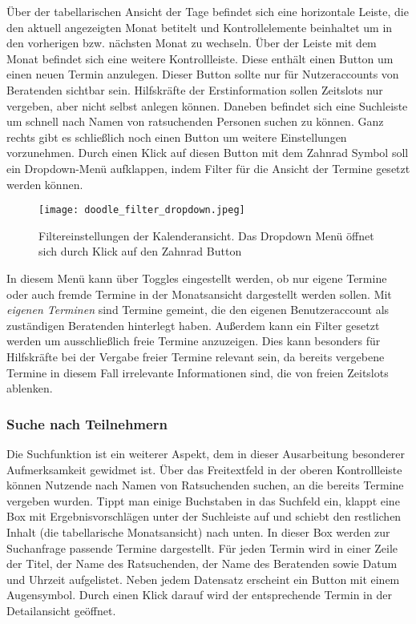 Über der tabellarischen Ansicht der Tage befindet sich eine horizontale Leiste, die den aktuell angezeigten Monat betitelt und Kontrollelemente beinhaltet um in den vorherigen bzw. nächsten Monat zu wechseln. Über der Leiste mit dem Monat befindet sich eine weitere Kontrollleiste. Diese enthält einen Button um einen neuen Termin anzulegen. Dieser Button sollte nur für Nutzeraccounts von Beratenden sichtbar sein. Hilfskräfte der Erstinformation sollen Zeitslots nur vergeben, aber nicht selbst anlegen können. Daneben befindet sich eine Suchleiste um schnell nach Namen von ratsuchenden Personen suchen zu können. Ganz rechts gibt es schließlich noch einen Button um weitere Einstellungen vorzunehmen. Durch einen Klick auf diesen Button mit dem Zahnrad Symbol soll ein Dropdown-Menü aufklappen, indem Filter für die Ansicht der Termine gesetzt werden können.

\begin{figure}[H]
    \caption{Filtereinstellungen der Kalenderansicht. Das Dropdown Menü öffnet sich durch Klick auf den Zahnrad Button}
    \centering
    \texttt{[image: doodle\_filter\_dropdown.jpeg]}
\end{figure}

In diesem Menü kann über Toggles eingestellt werden, ob nur eigene Termine oder
auch fremde Termine in der Monatsansicht dargestellt werden sollen. Mit
\textit{eigenen Terminen} sind Termine gemeint, die den eigenen Benutzeraccount
als zuständigen Beratenden hinterlegt haben. Außerdem kann ein Filter gesetzt
werden um ausschließlich freie Termine anzuzeigen. Dies kann besonders für
Hilfskräfte bei der Vergabe freier Termine relevant sein, da bereits vergebene
Termine in diesem Fall irrelevante Informationen sind, die von freien Zeitslots
ablenken.

\subsubsection{Suche nach Teilnehmern}

Die Suchfunktion ist ein weiterer Aspekt, dem in dieser Ausarbeitung besonderer
Aufmerksamkeit gewidmet ist. Über das Freitextfeld in der oberen Kontrollleiste
können Nutzende nach Namen von Ratsuchenden suchen, an die bereits Termine
vergeben wurden. Tippt man einige Buchstaben in das Suchfeld ein, klappt eine
Box mit Ergebnisvorschlägen unter der Suchleiste auf und schiebt den restlichen
Inhalt (die tabellarische Monatsansicht) nach unten. In dieser Box werden zur
Suchanfrage passende Termine dargestellt. Für jeden Termin wird in einer Zeile
der Titel, der Name des Ratsuchenden, der Name des Beratenden sowie Datum und
Uhrzeit aufgelistet. Neben jedem Datensatz erscheint ein Button mit einem
Augensymbol. Durch einen Klick darauf wird der entsprechende Termin in der
Detailansicht geöffnet.

